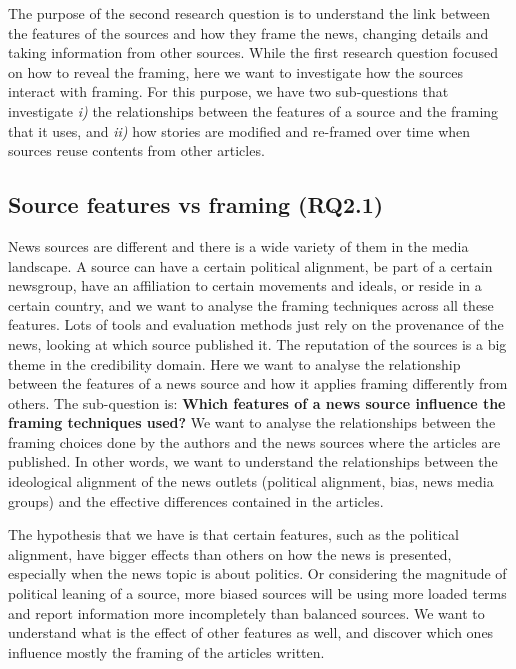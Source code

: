 The purpose of the second research question is to understand the link between the features of the sources and how they frame the news, changing details and taking information from other sources.
While the first research question focused on how to reveal the framing, here we want to investigate how the sources interact with framing. For this purpose, we have two sub-questions that investigate \emph{i)} the relationships between the features of a source and the framing that it uses, and \emph{ii)} how stories are modified and re-framed over time when sources reuse contents from other articles.

\subsection{Source features vs framing (RQ2.1)}
News sources are different and there is a wide variety of them in the media landscape.
A source can have a certain political alignment, be part of a certain newsgroup, have an affiliation to certain movements and ideals, or reside in a certain country, and we want to analyse the framing techniques across all these features.
Lots of tools and evaluation methods just rely on the provenance of the news, looking at which source published it. The reputation of the sources is a big theme in the credibility domain.
Here we want to analyse the relationship between the features of a news source and how it applies framing differently from others. The sub-question is:
\textbf{Which features of a news source influence the framing techniques used?}
We want to analyse the relationships between the framing choices done by the authors and the news sources where the articles are published. In other words, we want to understand the relationships between the ideological alignment of the news outlets (political alignment, bias, news media groups) and the effective differences contained in the articles.



The hypothesis that we have is that certain features, such as the political alignment, have bigger effects than others on how the news is presented, especially when the news topic is about politics.
Or considering the magnitude of political leaning of a source, more biased sources will be using more loaded terms and report information more incompletely than balanced sources.
We want to understand what is the effect of other features as well, and discover which ones influence mostly the framing of the articles written.

